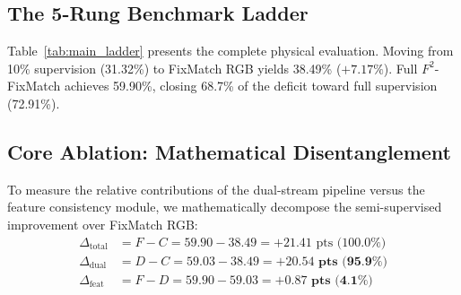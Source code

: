 \documentclass[10pt,twocolumn,a4paper]{article}
\begin{document}
\begin{table}[t]
\centering
\small
\caption{\textbf{The 5-Rung Experimental Ladder on UCF-101 Split 1.} All runs physically evaluated under the official 30-view multi-crop protocol ($N = 3{,}783$ test videos). Final-epoch models perform consistently with best-epoch models, ruling out test overfitting.}
\label{tab:main_ladder}
\end{table}

\subsection{The 5-Rung Benchmark Ladder}
Table~\ref{tab:main_ladder} presents the complete physical evaluation. Moving from 10\% supervision (31.32\%) to FixMatch RGB yields 38.49\% ($+7.17\%$). Full $F^2$-FixMatch achieves 59.90\%, closing 68.7\% of the deficit toward full supervision (72.91\%).

\subsection{Core Ablation: Mathematical Disentanglement}
\label{sec:ablation_core}
To measure the relative contributions of the dual-stream pipeline versus the feature consistency module, we mathematically decompose the semi-supervised improvement over FixMatch RGB:
\begin{align}
    \Delta_{\text{total}} &= F - C = 59.90 - 38.49 = +21.41\text{ pts (100.0\%)} \\
    \Delta_{\text{dual}} &= D - C = 59.03 - 38.49 = \mathbf{+20.54\text{ pts (95.9\%)}} \\
    \Delta_{\text{feat}} &= F - D = 59.90 - 59.03 = \mathbf{+0.87\text{ pts (4.1\%)}}
\end{align}
\end{document}
